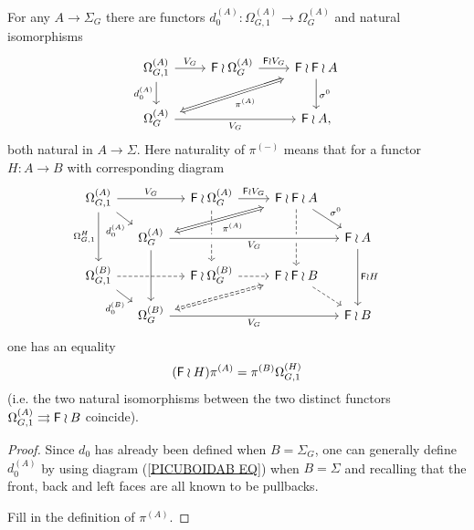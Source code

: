 \documentclass[a4paper,10pt]{article}%
\begin{document}
\begin{proposition}
For any $A \to \Sigma_G$ there are functors 
$d_0^{(A)}\colon \Omega_{G,1}^{(A)} \to \Omega_{G}^{(A)}$ and natural isomorphisms
\begin{equation}\label{SHUFFLEPERMA EQ}
	\begin{tikzcd}
	\Omega_{G,1}^{(A)} \ar{r}{V_G} \ar{d}[swap]{d_{0}^{(A)}}&
	\Fin \wr \Omega_{G}^{(A)} \ar{r}{\Fin \wr V_G} &
	|[alias=FFOmega]|\Fin \wr \Fin \wr A \ar{d}{\sigma^0}
\\
	|[alias=Omega]|\Omega_{G}^{(A)} \ar{rr}[swap]{V_G} &&
	\Fin \wr A,
	\arrow[Leftrightarrow, from=FFOmega, to=Omega,shorten <=0.15cm,,shorten >=0.15cm,"\pi^{(A)}"]
	\end{tikzcd}
\end{equation}
both natural in $A \to \Sigma$.
Here naturality of $\pi^{(\minus)}$ means that for a functor $H \colon A \to B$ with corresponding diagram
\begin{equation}\label{PICUBOIDAB EQ}
\begin{tikzcd}[column sep = small, row sep = small]
	\Omega_{G,1}^{(A)} \ar{rr}{V_G} \ar{rd}[swap,near end]{d^{(A)}_0} \ar{dd}[swap]{\Omega_{G,1}^{H}}
	&&
	\Fin \wr \Omega_{G}^{(A)} \ar{rr}{\Fin \wr V_G} \ar[dd,dashed]&&
	|[alias=FFOmegan]|\Fin \wr \Fin \wr A  \ar[dd,dashed] \ar{rd}{\sigma^0}
\\
	&
	|[alias=Omeganp1]|\Omega_{G}^{(A)} \ar[crossing over]{rrrr}[swap]{V_G} \ar[crossing over]{dd} &&&&
	\Fin \wr A \ar{dd}{\Fin \wr H}&
\\
	\Omega_{G,1}^{(B)} \ar[dashed]{rr} \ar{rd}[swap,near end]{d^{(B)}_0}&&
	\Fin \wr \Omega^{(B)}_{G} \ar[rr,dashed] &&
	|[alias=FFOmeganm1]|\Fin \wr \Fin \wr B \ar[rd,dashed] 
\\
	&
	|[alias=Omegan]|\Omega^{(B)}_{G} \ar{rrrr}[swap]{V_G} &&&&
	\Fin \wr B &
	\arrow[Leftrightarrow, from=Omeganp1, to=FFOmegan,shorten <=0.15cm,shorten >=0.15cm,swap,"\pi^{(A)}"]
	\arrow[Leftrightarrow, from=FFOmeganm1, to=Omegan,shorten <=0.15cm,shorten >=0.15cm,dashed]
\end{tikzcd}
\end{equation}
one has an equality 
\[(\mathsf{F} \wr H)\pi^{(A)} = \pi^{(B)}\Omega_{G,1}^{(H)}\]
 (i.e. the two natural isomorphisms between the two distinct functors $\Omega_{G,1}^{(A)} \rightrightarrows \mathsf{F} \wr B$ coincide).
\end{proposition}

\begin{proof}
Since $d_0$ has already been defined when $B=\Sigma_G$, one can generally define $d_0^{(A)}$ by using diagram (\ref{PICUBOIDAB EQ}) when $B=\Sigma$ and recalling that the front, back and left faces are all known to be pullbacks.

{\color{red} Fill in the definition of $\pi^{(A)}$.}
\end{proof}
\end{document}
